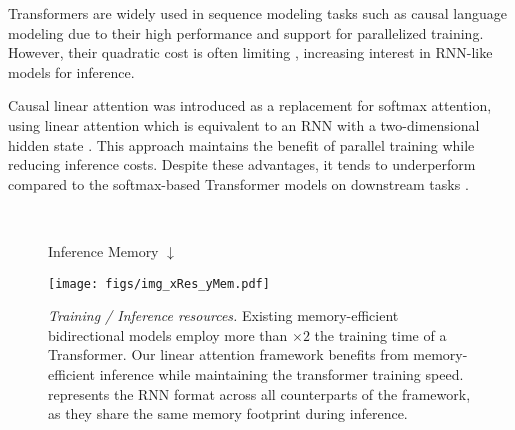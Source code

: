 

 Transformers \citep{vaswani_attention_2017} are widely used in sequence modeling tasks such as causal language modeling \citep{brown2020language,team2023gemini} due to their high performance and support for parallelized training. However, their quadratic cost is often limiting \citep{lra}, increasing interest in RNN-like models for inference. 


Causal linear attention was introduced as a replacement for softmax attention, using linear attention which is equivalent to an RNN with a two-dimensional hidden state \cite{trans_rnn}. This approach maintains the benefit of parallel training while reducing inference costs. Despite these advantages, it tends to underperform compared to the softmax-based Transformer models on downstream tasks \cite{deltanet}.

\begin{figure}[t] 
    \centering
    \\
    \begin{center}
        \begin{footnotesize}
        Inference Memory $\downarrow$
        \end{footnotesize}
    \end{center}
    \vspace{-2.2mm}
    \texttt{[image: figs/img\_xRes\_yMem.pdf]}
    \vspace{-1mm}
  \caption{ %
  \textit{Training / Inference resources.} Existing memory-efficient bidirectional models employ more than $\times 2$ the training time of a Transformer. Our linear attention framework benefits from memory-efficient inference while maintaining the transformer training speed. \lion represents the RNN format across all counterparts of the framework, as they share the same memory footprint during inference.
  }
  \vspace{-5mm}
  \label{fig:blm}
\end{figure}

